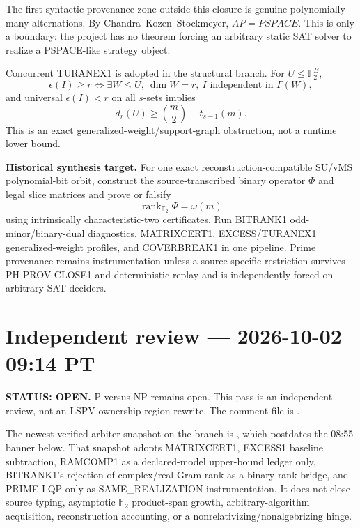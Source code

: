 \documentclass[11pt]{article}
\begin{document}
The first syntactic provenance zone outside this closure is genuine polynomially many alternations.
By Chandra--Kozen--Stockmeyer, \(AP=PSPACE\). This is only a boundary: the project has no theorem
forcing an arbitrary static SAT solver to realize a PSPACE-like strategy object.

Concurrent TURANEX1 is adopted in the structural branch. For \(U\le\mathbb F_2^E\),
\[
\epsilon(I)\ge r
\iff
\exists W\le U,\ \dim W=r,\ I\text{ independent in }\Gamma(W),
\]
and universal \(\epsilon(I)<r\) on all \(s\)-sets implies
\[
d_r(U)\ge\binom m2-t_{s-1}(m).
\]
This is an exact generalized-weight/support-graph obstruction, not a runtime lower bound.

\begin{candidatebox}
\textbf{Historical synthesis target.}
For one exact reconstruction-compatible SU/vMS polynomial-bit orbit, construct the source-transcribed
binary operator \(\Phi\) and legal slice matrices and prove or falsify
\[
\operatorname{rank}_{\mathbb F_2}\Phi=\omega(m)
\]
using intrinsically characteristic-two certificates. Run BITRANK1 odd-minor/binary-dual diagnostics,
MATRIXCERT1, EXCESS/TURANEX1 generalized-weight profiles, and COVERBREAK1 in one pipeline.
Prime provenance remains instrumentation unless a source-specific restriction survives
PH-PROV-CLOSE1 and deterministic replay and is independently forced on arbitrary SAT deciders.
\end{candidatebox}



\section{Independent review --- 2026-10-02 09:14 PT}
\textbf{STATUS: OPEN.} P versus NP remains open. This pass is an independent review, not an
LSPV ownership-region rewrite. The comment file is
.

The newest verified arbiter snapshot on the branch is
, which postdates the 08:55 banner below.
That snapshot adopts MATRIXCERT1, EXCESS1 baseline subtraction, RAMCOMP1 as a declared-model
upper-bound ledger only, BITRANK1's rejection of complex/real Gram rank as a binary-rank bridge,
and PRIME-LQP only as SAME\_REALIZATION instrumentation. It does not close source typing,
asymptotic \(\mathbb F_2\) product-span growth, arbitrary-algorithm acquisition, reconstruction
accounting, or a nonrelativizing/nonalgebrizing hinge.
\end{document}
